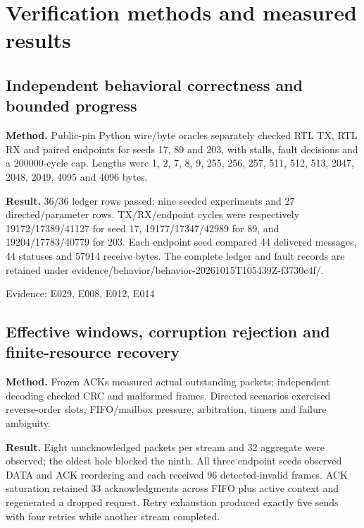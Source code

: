 \documentclass[11pt,a4paper]{article}
\begin{document}
\section{Verification methods and measured results}

\subsection{Independent behavioral correctness and bounded progress}

\textbf{Method.} Public-pin Python wire/\allowbreak{}byte oracles separately checked RTL TX,\allowbreak{} RTL RX and paired endpoints for seeds 17,\allowbreak{} 89 and 203,\allowbreak{} with stalls,\allowbreak{} fault decisions and a 200000-cycle cap. Lengths were 1,\allowbreak{} 2,\allowbreak{} 7,\allowbreak{} 8,\allowbreak{} 9,\allowbreak{} 255,\allowbreak{} 256,\allowbreak{} 257,\allowbreak{} 511,\allowbreak{} 512,\allowbreak{} 513,\allowbreak{} 2047,\allowbreak{} 2048,\allowbreak{} 2049,\allowbreak{} 4095 and 4096 bytes.

\textbf{Result.} 36/\allowbreak{}36 ledger rows passed: nine seeded experiments and 27 directed/\allowbreak{}parameter rows. TX/\allowbreak{}RX/\allowbreak{}endpoint cycles were respectively 19172/\allowbreak{}17389/\allowbreak{}41127 for seed 17,\allowbreak{} 19177/\allowbreak{}17347/\allowbreak{}42989 for 89,\allowbreak{} and 19204/\allowbreak{}17783/\allowbreak{}40779 for 203. Each endpoint seed compared 44 delivered messages,\allowbreak{} 44 statuses and 57914 receive bytes. The complete ledger and fault records are retained under evidence/\allowbreak{}behavior/\allowbreak{}behavior-20261015T105439Z-f3730c4f/\allowbreak{}.

{\small Evidence: E029,\allowbreak{} E008,\allowbreak{} E012,\allowbreak{} E014}

\subsection{Effective windows,\allowbreak{} corruption rejection and finite-resource recovery}

\textbf{Method.} Frozen ACKs measured actual outstanding packets; independent decoding checked CRC and malformed frames. Directed scenarios exercised reverse-order slots,\allowbreak{} FIFO/\allowbreak{}mailbox pressure,\allowbreak{} arbitration,\allowbreak{} timers and failure ambiguity.

\textbf{Result.} Eight unacknowledged packets per stream and 32 aggregate were observed; the oldest hole blocked the ninth. All three endpoint seeds observed DATA and ACK reordering and each received 96 detected-invalid frames. ACK saturation retained 33 acknowledgments across FIFO plus active context and regenerated a dropped request. Retry exhaustion produced exactly five sends with four retries while another stream completed.
\end{document}
